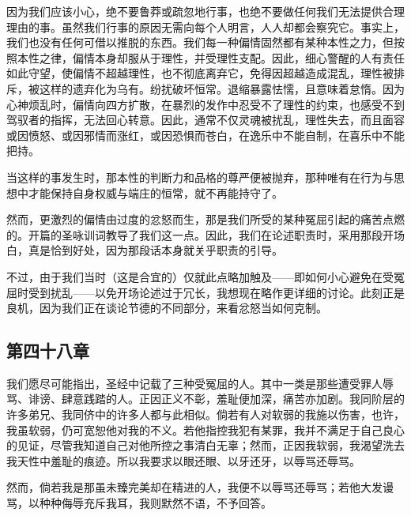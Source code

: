 因为我们应该小心，绝不要鲁莽或疏忽地行事，也绝不要做任何我们无法提供合理理由的事。虽然我们行事的原因无需向每个人明言，人人却都会察究它。事实上，我们也没有任何可借以推脱的东西。我们每一种偏情固然都有某种本性之力，但按照本性之律，偏情本身却服从于理性，并受理性支配。因此，细心警醒的人有责任如此守望，使偏情不超越理性，也不彻底离弃它，免得因超越造成混乱，理性被排斥，被这样的遗弃化为乌有。纷扰破坏恒常。退缩暴露怯懦，且意味着怠惰。因为心神烦乱时，偏情向四方扩散，在暴烈的发作中忍受不了理性的约束，也感受不到驾驭者的指挥，无法回心转意。因此，通常不仅灵魂被扰乱，理性失去，而且面容或因愤怒、或因邪情而涨红，或因恐惧而苍白，在逸乐中不能自制，在喜乐中不能把持。\par

当这样的事发生时，那本性的判断力和品格的尊严便被抛弃，那种唯有在行为与思想中才能保持自身权威与端庄的恒常，就不再能持守了。\par

然而，更激烈的偏情由过度的忿怒而生，那是我们所受的某种冤屈引起的痛苦点燃的。开篇的圣咏训词教导了我们这一点。因此，我们在论述职责时，采用那段开场白，真是恰到好处，因为那段话本身就关乎职责的引导。\par

不过，由于我们当时（这是合宜的）仅就此点略加触及——即如何小心避免在受冤屈时受到扰乱——以免开场论述过于冗长，我想现在略作更详细的讨论。此刻正是良机，因为我们正在谈论节德的不同部分，来看忿怒当如何克制。\par


\subsection{第四十八章}

\par

我们愿尽可能指出，圣经中记载了三种受冤屈的人。其中一类是那些遭受罪人辱骂、诽谤、肆意践踏的人。正因正义不彰，羞耻便加深，痛苦亦加剧。我同阶层的许多弟兄、我同侪中的许多人都与此相似。倘若有人对软弱的我施以伤害，也许，我虽软弱，仍可宽恕他对我的不义。若他指控我犯有某罪，我并不满足于自己良心的见证，尽管我知道自己对他所控之事清白无辜；然而，正因我软弱，我渴望洗去我天性中羞耻的痕迹。所以我要求以眼还眼、以牙还牙，以辱骂还辱骂。\par

然而，倘若我是那虽未臻完美却在精进的人，我便不以辱骂还辱骂；若他大发谩骂，以种种侮辱充斥我耳，我则默然不语，不予回答。\par

